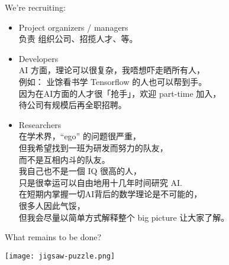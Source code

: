 \documentclass[10pt]{beamer}
\newcommand{\emp}[1]{{\color{blue}#1}}
\begin{document}
\begin{frame}
\vspace*{2em}
{\color{blue} \Large We're recruiting:}
\vspace*{1em}
\begin{itemize}
	\item \emp{Project organizers / managers} \\
		负责 组织公司、招揽人才、等。
	\item \emp{Developers} \\
		AI 方面，理论可以很复杂，我唔想吓走晒所有人，\\
		例如： 业馀看书学 Tensorflow 的人也可以帮到手。 \\
		因为在AI方面的人才很「抢手」，欢迎 part-time 加入，\\
		待公司有规模后再全职招聘。
	\item \emp{Researchers} \\
		在学术界，``ego'' 的问题很严重， \\
		但我希望找到一班为研发而努力的队友，\\
		而不是互相内斗的队友。\\
		我自己也不是一個 IQ 很高的人，\\
		只是很幸运可以自由地用十几年时间研究 AI. \\
		在短期内掌握一切AI背后的数学理论是不可能的，\\
		很多人因此气馁，\\
		但我会尽量以简单方式解释整个 big picture 让大家了解。 
\end{itemize}
\end{frame}

\begin{frame}
\vspace*{2em}
{\color{blue} \Large What remains to be done?}

\vspace{0.5em}
\hspace*{5em}\texttt{[image: jigsaw-puzzle.png]}
\end{frame}
\end{document}
